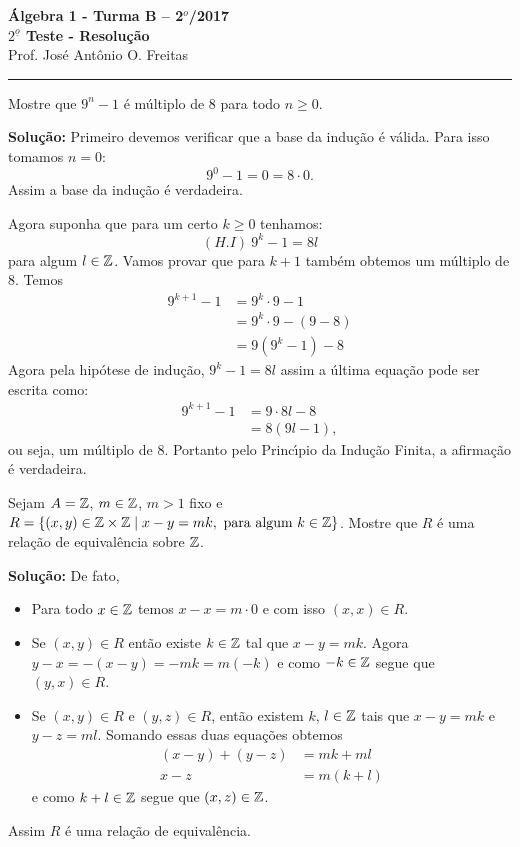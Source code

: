 \documentclass[12pt]{article}
\begin{document}


\begin{center}
{\Large\bf {\'A}lgebra 1 - Turma B -- 2$^{o}$/2017} \\ \vspace{9pt} {\large\bf
  $2^{\underline{o}}$ Teste - Resolu\c{c}\~ao}\\
\vspace{9pt} Prof. Jos{\'e} Ant{\^o}nio O. Freitas
\end{center}
\hrule

\vspace{.6cm}


\vspace{.6cm}

\questao Mostre que $9^n - 1$ {\'e} m\'ultiplo de 8 para todo $n \ge 0$.

\noindent\textbf{Solu\c{c}\~ao:} Primeiro devemos verificar que a base da indu\c{c}\~ao \'e v\'alida. Para isso tomamos $n = 0$:
\[
	9^0 - 1 = 0 = 8\cdot 0.
\]
Assim a base da indu\c{c}\~ao \'e verdadeira.

Agora suponha que para um certo $k \ge 0$ tenhamos:
\[
	(H.I)\ 9^k - 1 = 8l
\]
para algum $l \in \mathbb{Z}$. Vamos provar que para $k + 1$ tamb\'em obtemos um m\'ultiplo de 8. Temos
\begin{align*}
	9^{k + 1} - 1 &= 9^k\cdot 9 - 1 \\& = 9^k\cdot 9 - (9 - 8) \\ &= 9(9^k - 1) - 8
\end{align*}
Agora pela hip\'otese de indu\c{c}\~ao, $9^k - 1 = 8l$ assim a \'ultima equa\c{c}\~ao pode ser escrita como:
\begin{align*}
	9^{k + 1} - 1 &= 9\cdot 8l - 8 \\ &= 8(9l - 1),
\end{align*}
ou seja, um m\'ultiplo de 8. Portanto pelo Princ{\'\i}pio da Indu\c{c}\~ao Finita, a afirma\c{c}\~ao \'e verdadeira.

\vspace{.5cm}

\questao Sejam $A = \mathbb{Z}$, $m \in \mathbb{Z}$, $m > 1$ fixo e $R = \{(x,y)\in \mathbb{Z} \times \mathbb{Z} \mid x - y = mk, \mbox{ para algum } k \in \mathbb{Z}\}$. Mostre que $R$
é uma rela{\c c}{\~a}o de equival{\^e}ncia sobre $\mathbb{Z}$.

\noindent\textbf{Solu\c{c}\~ao:} De fato,
	\begin{itemize}
		\item Para todo $x\in \mathbb{Z}$ temos $x - x = m\cdot0$ e com isso $(x,x) \in R$.
		\item Se $(x,y) \in R$ então existe $k \in \mathbb{Z}$ tal que $x - y = mk$. Agora $y - x = -(x - y) = -mk = m (-k)$ e como $-k \in \mathbb{Z}$ segue que $(y,x) \in R$.
		\item Se $(x,y) \in R$ e $(y,z) \in R$, então existem $k$, $l\in \mathbb{Z}$ tais que $x - y = mk$ e $y - z = ml$.
		Somando essas duas equações obtemos
		\begin{align*}
			(x - y) + (y - z) &= mk + ml\\
			x - z &= m(k + l)
		\end{align*}
		e como $k + l \in \mathbb{Z}$ segue que $(x,z) \in \mathbb{Z}$.
	\end{itemize}
	
	Assim $R$ é uma relação de equivalência.
\end{document}
